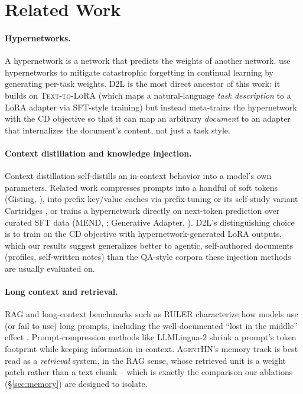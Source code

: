 \documentclass[11pt]{article}
\newcommand{\DTL}{D2L}
\newcommand{\agenthn}{\textsc{AgentHN}}
\begin{document}
\section{Related Work}

\paragraph{Hypernetworks.} A hypernetwork \citep{ha2016hypernetworks} is a network that predicts the weights of another network. \citet{vonoswald2020continual} use hypernetworks to mitigate catastrophic forgetting in continual learning by generating per-task weights. \DTL{} is the most direct ancestor of this work: it builds on \textsc{Text-to-LoRA} \citep{charakorn2025texttolora} (which maps a natural-language \emph{task description} to a LoRA adapter via SFT-style training) but instead meta-trains the hypernetwork with the CD objective so that it can map an arbitrary \emph{document} to an adapter that internalizes the document's content, not just a task style.

\paragraph{Context distillation and knowledge injection.} Context distillation \citep{askell2021general,snell2023learning} self-distills an in-context behavior into a model's own parameters. Related work compresses prompts into a handful of soft tokens (Gisting, \citealp{mu2024learning}), into prefix key/value caches via prefix-tuning \citep{li2021prefixtuning} or its self-study variant Cartridges \citep{eyuboglu2025cartridges}, or trains a hypernetwork directly on next-token prediction over curated SFT data (MEND, \citealp{li2024mend}; Generative Adapter, \citealp{chen2025generative}). \DTL{}'s distinguishing choice is to train on the CD objective with hypernetwork-generated LoRA outputs, which our results suggest generalizes better to agentic, self-authored documents (profiles, self-written notes) than the QA-style corpora these injection methods are usually evaluated on.

\paragraph{Long context and retrieval.} RAG \citep{lewis2020retrieval} and long-context benchmarks such as RULER \citep{hsieh2024ruler} characterize how models use (or fail to use) long prompts, including the well-documented ``lost in the middle'' effect \citep{liu2024lost}. Prompt-compression methods like LLMLingua-2 \citep{pan2024llmlingua} shrink a prompt's token footprint while keeping information in-context. \agenthn{}'s memory track is best read as a \emph{retrieval} system, in the RAG sense, whose retrieved unit is a weight patch rather than a text chunk -- which is exactly the comparison our ablations (\S\ref{sec:memory}) are designed to isolate.
\end{document}
